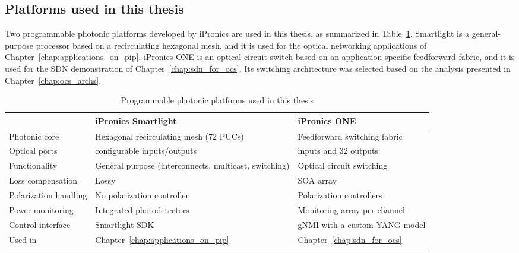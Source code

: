 \subsection{Platforms used in this thesis}\label{sub:platforms}
Two programmable photonic platforms developed by iPronics are used in this thesis, as summarized in Table~\ref{tab:ch2-platforms}.
Smartlight is a general-purpose processor based on a recirculating hexagonal mesh, and it is used for the optical networking applications of Chapter~\ref{chap:applications_on_pip}.
iPronics ONE is an optical circuit switch based on an application-specific feedforward fabric, and it is used for the SDN demonstration of Chapter~\ref{chap:sdn_for_ocs}.
Its switching architecture was selected based on the analysis presented in Chapter~\ref{chap:ocs_archs}.

\begin{table}[ht]
    \centering
    \small
    \caption{Programmable photonic platforms used in this thesis}
    \label{tab:ch2-platforms}
    \begin{tabular}{>{\raggedright\arraybackslash}p{}>{\raggedright\arraybackslash}p{}>{\raggedright\arraybackslash}p{}}
        \toprule
                              & \textbf{iPronics Smartlight}                          & \textbf{iPronics ONE}          \\
        \midrule
        Photonic core         & Hexagonal recirculating mesh (72 PUCs)                & Feedforward switching fabric   \\
        Optical ports         & 28 configurable inputs/outputs                        & 32 inputs and 32 outputs       \\
        Functionality         & General purpose (interconnects, multicast, switching) & Optical circuit switching      \\
        Loss compensation     & Lossy                                                 & SOA array                      \\
        Polarization handling & No polarization controller                            & Polarization controllers       \\
        Power monitoring      & Integrated photodetectors                             & Monitoring array per channel   \\
        Control interface     & Smartlight SDK                                        & gNMI with a custom YANG model  \\
        Used in               & Chapter~\ref{chap:applications_on_pip}                & Chapter~\ref{chap:sdn_for_ocs} \\
        \bottomrule
    \end{tabular}
\end{table}

